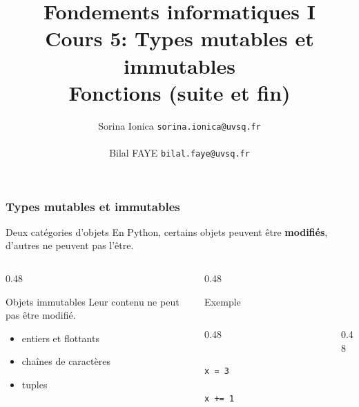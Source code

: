 \documentclass[10pt, xcolor={svgnames}]{beamer}
\title[IN100 Cours 4]{\textbf{Fondements informatiques I}\\
Cours 5: Types mutables et immutables\\ Fonctions (suite et fin)}
\author[]{Sorina Ionica \texttt{sorina.ionica@uvsq.fr} \\~\\Bilal FAYE  \texttt{bilal.faye@uvsq.fr} }
\institute{}
\date{}
\begin{document}
\begin{frame}
\titlepage
\end{frame}
\begin{frame}[fragile]
	\frametitle{Types mutables et immutables}
	
	\begin{block}{Deux catégories d'objets}
		En Python, certains objets peuvent être \textbf{modifiés},
		d'autres ne peuvent pas l'être.
	\end{block}
	
	\vspace{0.15cm}
	
	\begin{columns}[T]
		\begin{column}{0.48\textwidth}
			\begin{exampleblock}{Objets immutables}
				Leur contenu ne peut pas être modifié.
				
				\medskip
				
				\begin{itemize}
					\item entiers et flottants
					\item chaînes de caractères
					\item tuples
				\end{itemize}
			\end{exampleblock}
		\end{column}
		
		\begin{column}{0.48\textwidth}
			\begin{exampleblock}{Exemple}
				
				\begin{columns}[c]
					
					\begin{column}{0.48\textwidth}
						\begin{verbatim}
							x = 3
							x += 1
						\end{verbatim}
					\end{column}
					
					\begin{column}{0.48\textwidth}
						\centering
					\end{column}
					

\end{columns}
\end{exampleblock}
\end{column}
\end{columns}
\end{frame}
\end{document}
